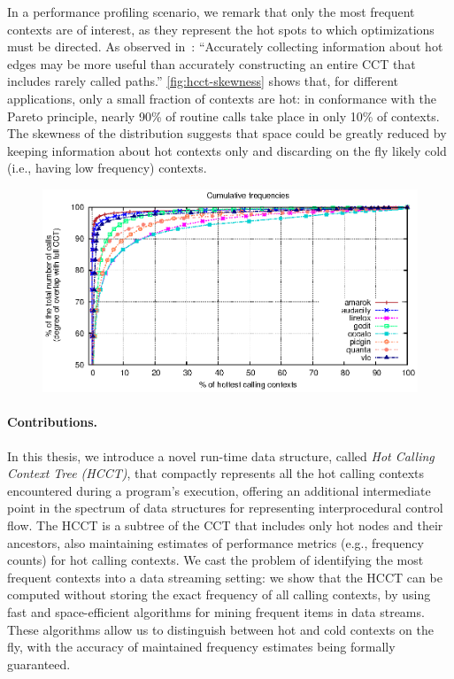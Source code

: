 In a performance profiling scenario, we remark that only the most frequent contexts are of interest, as they represent the hot spots to which optimizations must be directed. As observed in~\cite{Zhuang06}: ``Accurately collecting information about hot edges may be more useful than accurately constructing an entire CCT that includes rarely called paths.'' \myfigure\ref{fig:hcct-skewness} shows that, for different applications, only a small fraction of contexts are hot: in conformance with the Pareto principle, nearly 90\% of routine calls take place in only 10\% of contexts. The skewness of the distribution suggests that space could be greatly reduced by keeping information about hot contexts only and discarding on the fly likely cold (i.e., having low frequency) contexts.

\ifdefined\noauthorea
\begin{figure}[hb]
\begin{center}
\includegraphics[width=0.95\columnwidth]{figures/hcct-skewness/hcct-skewness.eps}
\caption{\protect}
\end{center}
\end{figure}
\fi

\paragraph*{Contributions.} In this thesis, we introduce a novel run-time data structure, called {\em Hot Calling Context Tree (HCCT)}, that compactly represents all the hot calling contexts encountered during a program's execution, offering an additional intermediate point in the spectrum of data structures for representing interprocedural control flow. The HCCT is a subtree of the CCT that includes only hot nodes and their ancestors, also maintaining estimates of performance metrics (e.g., frequency counts) for hot calling contexts. We cast the problem of identifying the most frequent contexts into a data streaming setting: we show that the HCCT can be computed without storing the exact frequency of all calling contexts, by using fast and space-efficient algorithms for mining frequent items in data streams. These algorithms allow us to distinguish between hot and cold contexts on the fly, with the accuracy of maintained frequency estimates being formally guaranteed.

